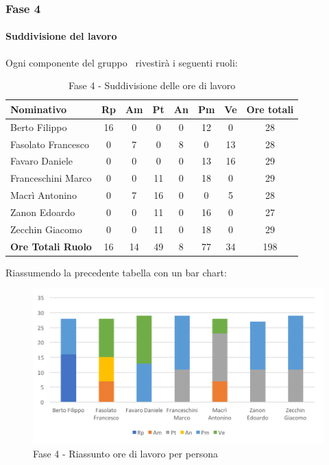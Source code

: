 \documentclass[../PianoDiProgetto.tex]{subfiles}
\begin{document}
		\newpage
		\subsubsection{Fase 4}
			\paragraph{Suddivisione del lavoro}
			Ogni componente del gruppo \kpanic\ rivestirà i seguenti ruoli:
			\begin{table}[h]
				\begin{tabularx}{\textwidth}{l * {6}{C} c}
				\toprule
				\textbf{Nominativo} & \textbf{Rp} & \textbf{Am} & \textbf{Pt} & \textbf{An} & \textbf{Pm} & \textbf{Ve} & \textbf{Ore totali} \\
				\midrule
				Berto Filippo &	16 & 0 & 0 & 0 & 12 & 0 & 28 \\
				Fasolato Francesco & 0 & 7 & 0 & 8 & 0 & 13 & 28 \\
				Favaro Daniele & 0 & 0 & 0 & 0 & 13 & 16 & 29 \\
				Franceschini Marco & 0 & 0 & 11 &	0 & 18 & 0 & 29 \\
				Macrì Antonino & 0 & 7 & 16 & 0 & 0 & 5 & 28 \\
				Zanon Edoardo &	0 & 0 & 11 & 0 & 16 & 0	 & 27 \\
				Zecchin Giacomo & 0 & 0 & 11 & 0 & 18 & 0 & 29 \\
				\midrule			
				\textbf{Ore Totali Ruolo} & 16 & 14 & 49 & 8 & 77 & 34 & 198 \\
				\bottomrule
				\end{tabularx}
				\caption{Fase 4 - Suddivisione delle ore di lavoro}		
			\end{table}
			
			Riassumendo la precedente tabella con un bar chart:	
			\begin{figure}[!h]
				\centering
				\includegraphics[width=\textwidth]{Preventivo/Immagini/fase4_oreRuoloPersona.png}
				\caption{Fase 4 - Riassunto ore di lavoro per persona}
			\end{figure}	
			
\end{document}
